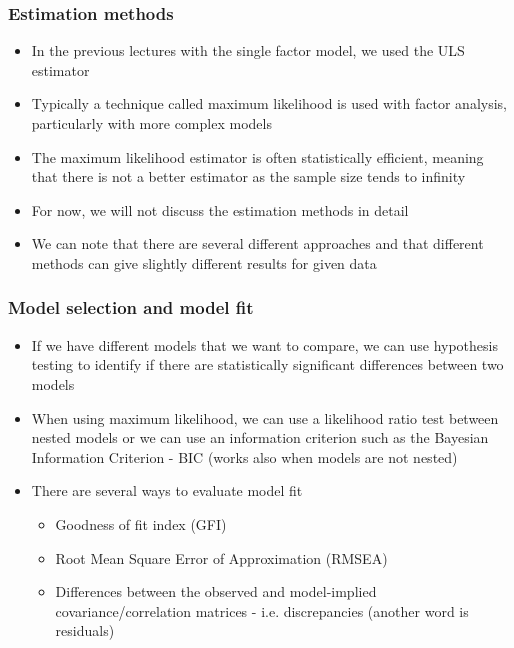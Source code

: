 \documentclass[compress]{beamer}
\begin{document}
\begin{frame}[fragile]
\frametitle{Estimation methods}
\begin{itemize}
\item In the previous lectures with the single factor model, we used the ULS estimator
\item Typically a technique called maximum likelihood is used with factor analysis, particularly with more complex models
\item The maximum likelihood estimator is often statistically efficient, meaning that there is not a better estimator as the sample size tends to infinity
\item For now, we will not discuss the estimation methods in detail
\item We can note that there are several different approaches and that different methods can give slightly different results for given data
\end{itemize}
\end{frame}


\begin{frame}[fragile]
\frametitle{Model selection and model fit}
\begin{itemize}
\item If we have different models that we want to compare, we can use hypothesis testing to identify if there are statistically significant differences between two models
\item When using maximum likelihood, we can use a likelihood ratio test between nested models or we can use an information criterion such as the Bayesian Information Criterion - BIC (works also when models are not nested)
\item There are several ways to evaluate model fit
\begin{itemize}
\item Goodness of fit index (GFI)
\item Root Mean Square Error of Approximation (RMSEA)
\item Differences between the observed and model-implied covariance/correlation matrices - i.e.  discrepancies (another word is residuals)
\end{itemize}
\end{itemize}
\end{frame}
\end{document}
